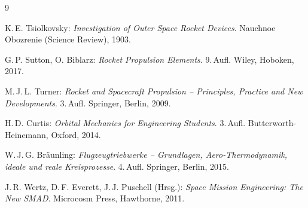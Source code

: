 ﻿\documentclass[12pt,a4paper]{article}
\begin{document}
\begin{thebibliography}{9}

K.\,E. Tsiolkovsky:
\textit{Investigation of Outer Space Rocket Devices}.
Nauchnoe Obozrenie (Science Review), 1903.

G.\,P. Sutton, O. Biblarz:
\textit{Rocket Propulsion Elements}.
9.\,Aufl. Wiley, Hoboken, 2017.

M.\,J.\,L. Turner:
\textit{Rocket and Spacecraft Propulsion -- Principles, Practice and New Developments}.
3.\,Aufl. Springer, Berlin, 2009.

H.\,D. Curtis:
\textit{Orbital Mechanics for Engineering Students}.
3.\,Aufl. Butterworth-Heinemann, Oxford, 2014.

W.\,J.\,G. Bräunling:
\textit{Flugzeugtriebwerke -- Grundlagen, Aero-Thermodynamik, ideale und reale Kreisprozesse}.
4.\,Aufl. Springer, Berlin, 2015.

J.\,R. Wertz, D.\,F. Everett, J.\,J. Puschell (Hrsg.):
\textit{Space Mission Engineering: The New SMAD}.
Microcosm Press, Hawthorne, 2011.

\end{thebibliography}
\end{document}
